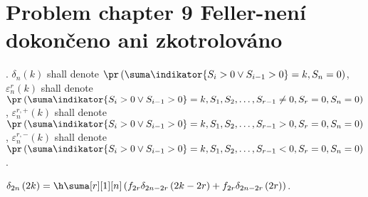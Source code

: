 \section{Problem chapter 9 Feller-není dokončeno ani zkotrolováno}
\begin{defn}\label{defn-delta_epsilon}
 \Lrws. $\delta_{n}\left( k\right)$ shall denote $\pr\left(\suma \indikator{S_i>0 \lor S_{i-1}>0}=k, S_n=0 \right)$,
 $ \varepsilon_{n}^r\left(k \right)$ shall denote $\pr\left(\suma \indikator{S_i>0 \lor S_{i-1}>0}=k, S_1, S_2, \ldots, S_{r-1}\neq 0, S_r=0, S_n=0 \right)$,
 $\varepsilon_{n}^{r,+}\left(k \right)$ shall denote $\pr\left(\suma \indikator{S_i>0 \lor S_{i-1}>0}=k, S_1, S_2, \ldots, S_{r-1} > 0, S_r=0, S_n=0 \right)$,
 $\varepsilon_{n}^{r,-}\left(k \right)$ shall denote $\pr\left(\suma \indikator{S_i>0 \lor S_{i-1}>0}=k, S_1, S_2, \ldots, S_{r-1} < 0, S_r=0, S_n=0 \right)$.
\end{defn}
\begin{lemma}\label{lemma-factorization_lemma}
 $\delta_{2n}\left( 2k\right)
 =\h \suma[r][1][n]\left( f_{2r} \delta_{2n-2r}\left(2k-2r\right)+f_{2r} \delta_{2n-2r}\left( 2r \right)\right)$.
\end{lemma}
